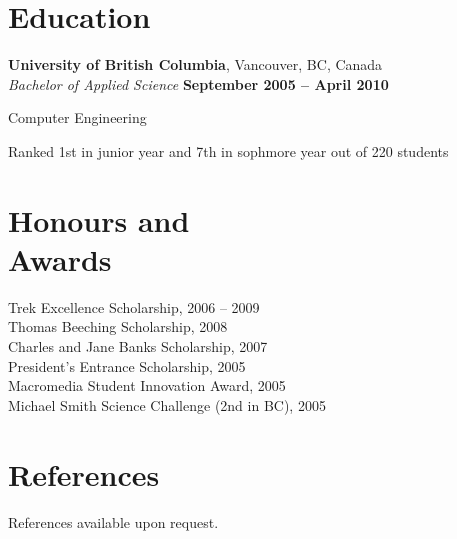 \documentclass[margin,line]{resume}
\begin{document}
\begin{resume}
	\section{\mysidestyle Education}

	\textbf{University of British Columbia}, Vancouver, BC, Canada
		\vspace{2mm}\\\vspace{1mm}%
	\textsl{Bachelor of Applied Science} \hfill \textbf{September 2005 -- April 2010}
		\vspace{-3mm}\\\vspace{-1mm}%
	\begin{list2}
		\item Computer Engineering
		\item Ranked 1st in junior year and 7th in sophmore year out of 220 students
	\end{list2}
	\vspace{-1.5mm}

	\section{\mysidestyle Honours and\\Awards}

	Trek Excellence Scholarship, 2006 -- 2009
		\vspace{1mm}\\%
	Thomas Beeching Scholarship, 2008
		\vspace{1mm}\\%
	Charles and Jane Banks Scholarship, 2007
		\vspace{1mm}\\%
	President's Entrance Scholarship, 2005
		\vspace{1mm}\\%
	Macromedia Student Innovation Award, 2005
		\vspace{1mm}\\%
	Michael Smith Science Challenge (2nd in BC), 2005

	\section{\mysidestyle References}
	References available upon request.


\end{resume}
\end{document}
